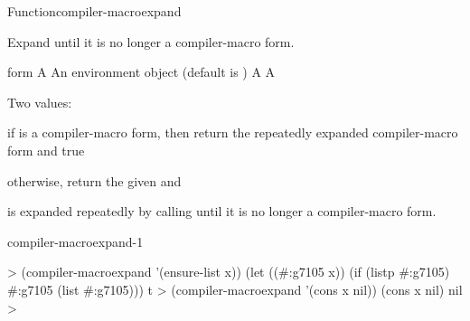 \documentclass[10pt,twoside,english,pdftex]{article}
\begin{document}
\begin{functiondoc}{Function}{compiler-macroexpand}{%
       
    }
%
%
  
\fnsyntax

\fnpurpose Expand  until it is no longer a compiler-macro form.

\fnpackage {}

\fnmodule {}

\fnargs
\begin{args}{form}
\arg[form] A 
\arg[env] An environment object (default is \nil)
\arg[expansion] A 
\arg[expanded-p] A 
\end{args}

\fnreturns
Two values:
\begin{tightitemize}
\item if  is a compiler-macro form, then return the 
  repeatedly expanded compiler-macro form and true
\item otherwise, return the given  and \nil{}
\end{tightitemize}

\fndescription
%
 is expanded repeatedly by calling
 until it is no longer a
compiler-macro form.

\begin{alsos}{compiler-macroexpand-1}
\end{alsos}

\fnexamples
%
\W\supp
\begin{example}
  > (compiler-macroexpand '(ensure-list x))
  (let ((#:g7105 x)) (if (listp #:g7105) #:g7105 (list #:g7105)))
  t
  > (compiler-macroexpand '(cons x nil))
  (cons x nil)
  nil
  >
\end{example}

\end{functiondoc}

\end{document}
